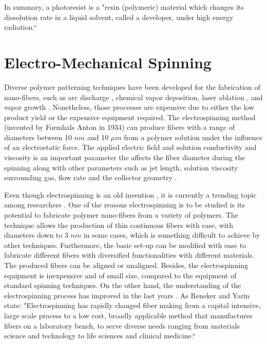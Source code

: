 In summary, a photoresist is a "resin (polymeric) material which changes its dissolution rate in a liquid solvent, called a developer, under high energy radiation.`` \cite{Landis2011}

\section{Electro-Mechanical Spinning}
Diverse polymer patterning techniques have been developed for the fabrication of nano-fibers, such as arc discharge \cite{Wang2007}, chemical vapor deposition, laser ablation \cite{Ren1998}, and vapor growth \cite{Nadarajah2008}. Nonetheless, those processes are expensive due to either the low product yield or the expensive equipment required. The electrospinning method (invented by Formhals Anton in 1934) can produce fibers with a range of diameters between 10 $n m$ and 10 $\mu m$ \cite{Jayaraman2003,Anton1930} from a polymer solution under the influence of an electrostatic force. The applied electric field and solution conductivity and viscosity is an important parameter the affects the fiber diameter during the spinning along with other parameters such as jet length, solution viscosity surrounding gas, flow rate and the collector geometry \cite{Anton1938,Larrondo1981,Baumgarten1971,Shin2001}.

Even though electrospinning is an old invention \cite{Anton1930}, it is currently a trending topic among researchers \cite{Huang2003,Reneker2008,Schiffman2008}. One of the reasons electrospinning is to be studied is its potential to fabricate polymer nano-fibers from a variety of polymers. The technique allows the production of thin continuous fibers with ease, with diameters down to 3 $n m$ in some cases, which is something difficult to achieve by other techniques. Furthermore, the basic set-up can be modified with ease to fabricate different fibers with diversified functionalities with different materials. The produced fibers can be aligned or unaligned. Besides, the electrospinning equipment is inexpensive and of small size, compared to the equipment of standard spinning techniques. On the other hand, the understanding of the electrospinning process has improved in the last years \cite{Li2012}. As Reneker and Yarin state: "Electrospinning has rapidly changed fiber making from a capital intensive, large scale process to a low cost, broadly applicable method that manufactures fibers on a laboratory bench, to serve diverse needs ranging from materials science and technology to life sciences and clinical medicine.`` \cite{Reneker2008}

